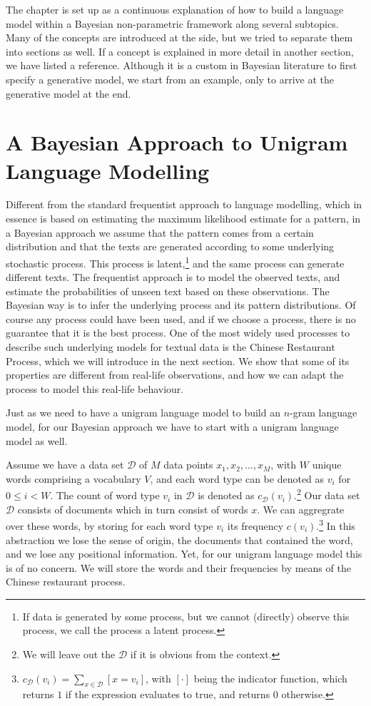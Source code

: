 The chapter is set up as a continuous explanation of how to build a language model within a Bayesian non-parametric framework along several subtopics. Many of the concepts are introduced at the side, but we tried to separate them into sections as well. If a concept is explained in more detail in another section, we have listed a reference. Although it is a custom in Bayesian literature to first specify a generative model, we start from an example, only to arrive at the generative model at the end.

\section{A Bayesian Approach to Unigram Language Modelling}

Different from the standard frequentist approach to language modelling, which in essence is based on estimating the maximum likelihood estimate for a pattern, in a Bayesian approach we assume that the pattern comes from a certain distribution and that the texts are generated according to some underlying stochastic process. This process is latent,\footnote{If data is generated by some process, but we cannot (directly) observe this process, we call the process a latent process.} and the same process can generate different texts. The frequentist approach is to model the observed texts, and estimate the probabilities of unseen text based on these observations. The Bayesian way is to infer the underlying process and its pattern distributions. Of course any process could have been used, and if we choose a process, there is no guarantee that it is the best process. One of the most widely used processes to describe such underlying models for textual data is the Chinese Restaurant Process, which we will introduce in the next section. We show that some of its properties are different from real-life observations, and how we can adapt the process to model this real-life behaviour.

Just as we need to have a unigram language model to build an $n$-gram language model, for our Bayesian approach we have to start with a unigram language model as well.

Assume we have a data set $\mathcal{D}$ of $M$ data points $x_1, x_2, \ldots, x_M$, with $W$ unique words comprising a vocabulary $V$, and each word type can be denoted as $v_i$ for $0 \leq i < W$. The count of word type $v_i$ in $\mathcal{D}$ is denoted as $c_\mathcal{D}(v_i)$.\footnote{We will leave out the $\mathcal{D}$ if it is obvious from the context.} Our data set $\mathcal{D}$ consists of documents which in turn consist of words $x$. We can aggregrate over these words, by storing for each word type $
v_i$ its frequency $c(v_i)$.\footnote{$c_\mathcal{D}(v_i) = \sum_{x\in\mathcal{D}} [x = v_i]$, with $[\cdot]$ being the indicator function, which returns $1$ if the expression evaluates to true, and returns $0$ otherwise.} In this abstraction we lose the sense of origin, the documents that contained the word, and we lose any positional information. Yet, for our unigram language model this is of no concern. We will store the words and their frequencies by means of the Chinese restaurant process.

